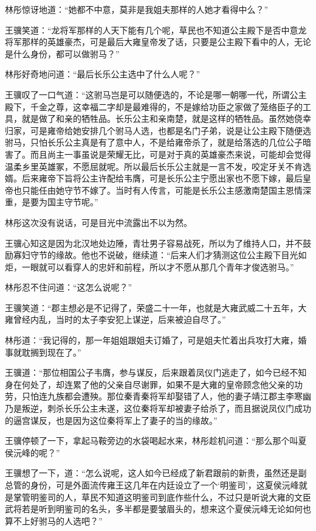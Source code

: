 林彤惊讶地道：“她都不中意，莫非是我姐夫那样的人她才看得中么？”

王骥笑道：“龙将军那样的人天下能有几个呢，草民也不知道公主殿下是否中意龙将军那样的英雄豪杰，可是最后大雍皇帝发了话，只要是公主殿下看中的人，无论是什么身份，都可以做驸马？”

林彤好奇地问道：“最后长乐公主选中了什么人呢？”

王骥叹了一口气道：“这驸马岂是可以随便选的，不论是哪一朝哪一代，所谓公主殿下，千金之尊，这幸福二字却是最难得的，不是嫁给功臣之家做了笼络臣子的工具，就是做了和亲的牺牲品。长乐公主和亲南楚，就是这样的牺牲品。虽然她侥幸归家，可是雍帝给她安排几个驸马人选，也都是名门子弟，说是让公主殿下随便选驸马，只怕长乐公主真是有了意中人，不是给雍帝杀了，就是给落选的几位公子暗害了。而且尚主一事虽说是荣耀无比，可是对于真的英雄豪杰来说，可能却会觉得温柔乡里英雄冢，不愿屈就呢。所以最后长乐公主就是一言不发，咬定牙关不肯选婿。后来雍帝下旨将公主许配给韦膺，可是长乐公主宁愿出家也不愿下嫁，最后皇帝也只能任由她守节不嫁了。当时有人传言，可能是长乐公主感激南楚国主恩情深重，是要为国主守节呢。”

林彤这次没有说话，可是目光中流露出不以为然。

王骥心知这是因为北汉地处边陲，青壮男子容易战死，所以为了维持人口，并不鼓励寡妇守节的缘故。他也不说破，继续道：“后来人们才猜测这位公主殿下目光如炬，一眼就可以看穿人的忠奸和前程，所以才不愿从那几个青年才俊选驸马。”

林彤忍不住问道：“这怎么说呢？”

王骥笑道：“郡主想必是不记得了，荣盛二十一年，也就是大雍武威二十五年，大雍曾经内乱，当时的太子李安犯上谋逆，后来被迫自尽了。”

林彤道：“我记得的，那一年姐姐跟姐夫订婚了，可是姐夫忙着出兵攻打大雍，婚事就耽搁到现在了。”

王骥道：“那位相国公子韦膺，参与谋反，后来跟着凤仪门逃走了，如今已经不知身在何处了，却连累了他的父亲自尽谢罪，如果不是大雍的皇帝顾念他父亲的功劳，只怕连九族都会遭殃。那位秦青秦将军却娶错了人，他的妻子靖江郡主李寒幽乃是叛逆，刺杀长乐公主未遂，这位秦将军却被妻子给杀了，而且据说凤仪门成功的逼宫谋反，也是因为这位秦将军上了妻子的当的缘故。”

王骥停顿了一下，拿起马鞍旁边的水袋喝起水来，林彤趁机问道：“那么那个叫夏侯沅峰的呢？”

王骥想了一下，道：“怎么说呢，这人如今已经成了新君跟前的新贵，虽然还是副总管的身份，可是外面流传雍王这几年在内廷设立了一个‘明鉴司’，这夏侯沅峰就是掌管明鉴司的人，草民不知道这明鉴司到底作些什么，不过只是听说大雍的文臣武将若是听到明鉴司的名头，多半都是要皱眉头的，想来这个夏侯沅峰无论如何也算不上好驸马的人选吧？”

